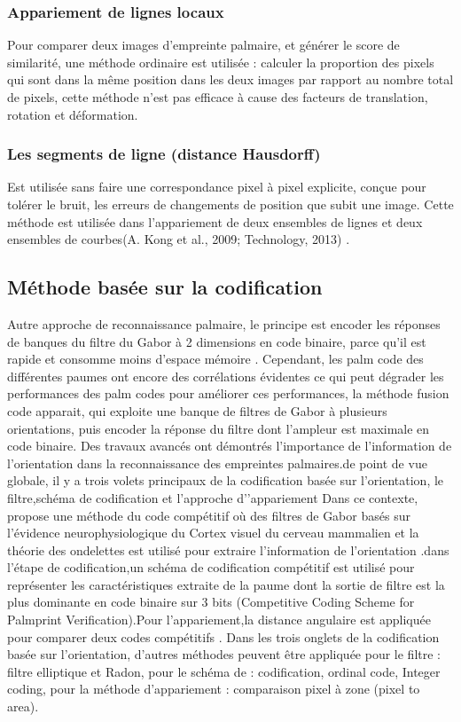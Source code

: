 \subsubsection{Appariement de lignes locaux}

Pour comparer deux images d’empreinte palmaire, et générer le score de similarité, une méthode ordinaire est utilisée : calculer la proportion des pixels qui sont dans la même position dans les deux images par rapport au nombre total de pixels, cette méthode n’est pas efficace à cause des facteurs de translation, rotation et déformation.

\subsubsection{Les segments de ligne (distance Hausdorff)}
Est utilisée sans faire une correspondance pixel à pixel explicite, conçue pour tolérer le bruit, les erreurs de changements de position que subit une image. Cette méthode est utilisée dans l’appariement de deux ensembles de lignes et deux ensembles de courbes(A. Kong et al., 2009; Technology, 2013) .

\subsection{Méthode basée sur la codification}
Autre approche de reconnaissance palmaire, le principe est encoder les réponses de banques du filtre du Gabor  à 2 dimensions en code binaire, parce qu’il est rapide et consomme moins d’espace mémoire \citep{yue2010survey}. Cependant, les palm code des différentes paumes ont encore des corrélations évidentes ce qui peut dégrader les performances des palm codes pour améliorer ces performances, la méthode fusion code apparait, qui exploite une banque de filtres de Gabor à plusieurs orientations, puis encoder la réponse du filtre dont l’ampleur est maximale en code binaire.
Des travaux avancés ont démontrés l’importance de l’information de l’orientation dans la reconnaissance des empreintes palmaires.de point de vue globale, il y a trois volets principaux de la codification basée sur l’orientation, le filtre,schéma de codification et l’approche d’’appariement Dans ce contexte, \citep{kong2004competitive} propose une méthode du code compétitif  où des filtres de Gabor basés sur l’évidence neurophysiologique du Cortex visuel du cerveau mammalien et la théorie des ondelettes  est utilisé pour extraire l’information de l’orientation .dans l’étape de codification,un schéma de codification compétitif  est utilisé pour représenter les caractéristiques extraite de la paume  dont la sortie de filtre est la plus dominante en code binaire sur 3 bits (Competitive Coding Scheme for Palmprint Verification).Pour l’appariement,la distance angulaire est appliquée pour comparer deux codes compétitifs .
Dans les trois onglets de la codification basée sur l’orientation, d’autres méthodes peuvent être appliquée pour le filtre : filtre elliptique et Radon, pour le schéma de : codification, ordinal code, Integer coding, pour la méthode d’appariement : comparaison pixel à zone (pixel to area).
